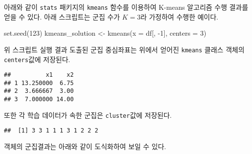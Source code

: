 \documentclass[
]{book}
\newenvironment{Shaded}{\begin{snugshade}}{\end{snugshade}}
\newcommand{\AttributeTok}[1]{\textcolor[rgb]{0.77,0.63,0.00}{#1}}
\newcommand{\DecValTok}[1]{\textcolor[rgb]{0.00,0.00,0.81}{#1}}
\newcommand{\FunctionTok}[1]{\textcolor[rgb]{0.00,0.00,0.00}{#1}}
\newcommand{\NormalTok}[1]{#1}
\newcommand{\OtherTok}[1]{\textcolor[rgb]{0.56,0.35,0.01}{#1}}
\newcommand{\SpecialCharTok}[1]{\textcolor[rgb]{0.00,0.00,0.00}{#1}}
\begin{document}
아래와 같이 \texttt{stats} 패키지의 \texttt{kmeans} 함수를 이용하여 K-means 알고리즘 수행 결과를 얻을 수 있다. 아래 스크립트는 군집 수가 \(K = 3\)라 가정하여 수행한 예이다.

\begin{Shaded}
\begin{Highlighting}[]
\FunctionTok{set.seed}\NormalTok{(}\DecValTok{123}\NormalTok{)}
\NormalTok{kmeans\_solution }\OtherTok{\textless{}{-}} \FunctionTok{kmeans}\NormalTok{(}\AttributeTok{x =}\NormalTok{ df[, }\SpecialCharTok{{-}}\DecValTok{1}\NormalTok{], }\AttributeTok{centers =} \DecValTok{3}\NormalTok{)}
\end{Highlighting}
\end{Shaded}

위 스크립트 실행 결과 도출된 군집 중심좌표는 위에서 얻어진 \texttt{kmeans} 클래스 객체의 \texttt{centers}값에 저장된다.

\begin{Shaded}
\end{Shaded}

\begin{verbatim}
##          x1    x2
## 1 13.250000  6.75
## 2  3.666667  3.00
## 3  7.000000 14.00
\end{verbatim}

또한 각 학습 데이터가 속한 군집은 \texttt{cluster}값에 저장된다.

\begin{Shaded}
\end{Shaded}

\begin{verbatim}
##  [1] 3 3 1 1 1 3 1 2 2 2
\end{verbatim}

객체의 군집결과는 아래와 같이 도식화하여 보일 수 있다.

\begin{Shaded}
\end{Shaded}
\end{document}
